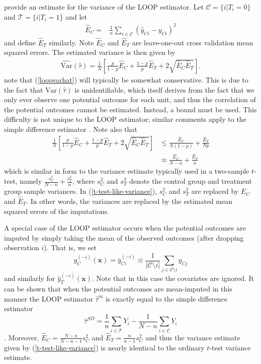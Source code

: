 \cite{loop} provide an estimate for the variance of the LOOP estimator.  Let $\mathcal{C} = \{i | T_i = 0\}$ and $\mathcal{T} = \{i | T_i = 1\}$ and let
\begin{align} 
\hat{E}_C = & \frac{1}{n}\sum_{i \in \mathcal{C}}(\hat{y}_{Ci} - y_{Ci})^2 \label{Echat}
\end{align}
and define $\hat{E}_T$ similarly.  Note $\hat{E}_C$ and $\hat{E}_T$ are leave-one-out cross validation mean squared errors.  The estimated variance is then given by
\begin{align} 
\widehat{\mathrm{Var}}(\hat{\tau}) =  \frac{1}{N}\left[\frac{p}{1-p}\hat{E}_C + \frac{1-p}{p}\hat{E}_T + 2\sqrt{\hat{E}_C\hat{E}_T}\right]. \label{loopvarhat}
\end{align}
\cite{loop} note that (\ref{loopvarhat}) will typically be somewhat conservative.  This is due to the fact that $\mathrm{Var}(\hat{\tau})$ is unidentifiable, which itself derives from the fact that we only ever observe one potential outcome for each unit, and thus the correlation of the potential outcomes cannot be estimated.  Instead, a bound must be used.  This difficulty is not unique to the LOOP estimator; similar comments apply to the simple difference estimator \citep{aronow2014}.  Note also that 
\begin{align} 
\frac{1}{N}\left[\frac{p}{1-p}\hat{E}_C + \frac{1-p}{p}\hat{E}_T + 2\sqrt{\hat{E}_C\hat{E}_T}\right] 
&\le
\frac{\hat{E}_C}{N(1-p)} + \frac{\hat{E}_T}{Np} \\
&\approx
\frac{\hat{E}_C}{N-n} + \frac{\hat{E}_T}{n} \label{t-test-like-variance}
\end{align}
which is similar in form to the variance estimate typically used in a two-sample $t$-test, namely $\frac{s^2_C}{N-n} + \frac{s^2_T}{n}$, where $s^2_C$ and $s^2_T$ denote the control group and treatment group sample variances.  In (\ref{t-test-like-variance}), $s^2_C$ and $s^2_T$ are replaced by $\hat{E}_C$ and $\hat{E}_T$.  In other words, the variances are replaced by the estimated mean squared errors of the imputations.

A special case of the LOOP estimator occurs when the potential outcomes are imputed by simply taking the mean of the observed  outcomes (after dropping observation $i$).  That is, we set 
\begin{equation}
\hat{y}^{(-i)}_C(\mathbf{x}) = \bar{y}^{(-i)}_{Ci}\equiv \frac{1}{|{\mathcal{C}\setminus i}|}\sum_{j \in \mathcal{C} \setminus i} y_{Cj} 
\end{equation}
and similarly for $\hat{y}^{(-i)}_T(\mathbf{x})$.  Note that in this case the covariates are ignored.  It can be shown that when the potential outcomes are mean-imputed in this manner the LOOP estimator $\hat{\tau}^{m}$ is exactly equal to the simple difference estimator 
\begin{equation}
\hat{\tau}^{SD} = \frac{1}{n}\sum_{i \in \mathcal{T}}Y_i - \frac{1}{N-n}\sum_{i \in \mathcal{C}}Y_i
\end{equation}
\citep{loop}.  Moreover, $\hat{E}_C = \frac{N-n}{N-n-1}s^2_C$ and $\hat{E}_T = \frac{n}{n-1}s^2_C$ and thus the variance estimate given by (\ref{t-test-like-variance}) is nearly identical to the ordinary $t$-test variance estimate.

